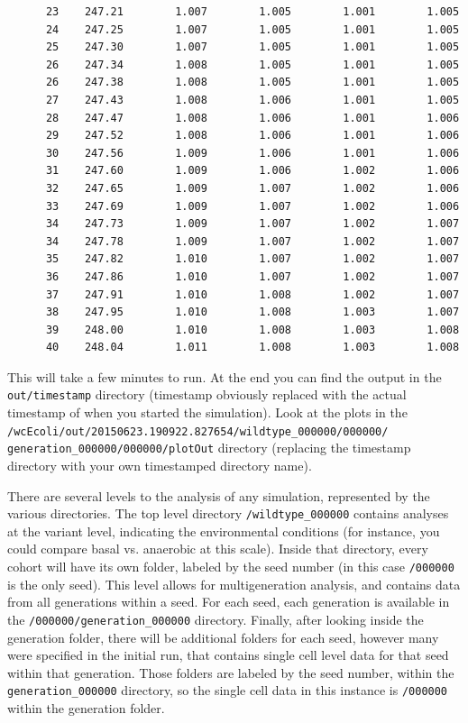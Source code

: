 \documentclass[12pt]{article}
\begin{document}
\begin{lstlisting}
      23    247.21        1.007        1.005        1.001        1.005
      24    247.25        1.007        1.005        1.001        1.005
      25    247.30        1.007        1.005        1.001        1.005
      26    247.34        1.008        1.005        1.001        1.005
      26    247.38        1.008        1.005        1.001        1.005
      27    247.43        1.008        1.006        1.001        1.005
      28    247.47        1.008        1.006        1.001        1.006
      29    247.52        1.008        1.006        1.001        1.006
      30    247.56        1.009        1.006        1.001        1.006
      31    247.60        1.009        1.006        1.002        1.006
      32    247.65        1.009        1.007        1.002        1.006
      33    247.69        1.009        1.007        1.002        1.006
      34    247.73        1.009        1.007        1.002        1.007
      34    247.78        1.009        1.007        1.002        1.007
      35    247.82        1.010        1.007        1.002        1.007
      36    247.86        1.010        1.007        1.002        1.007
      37    247.91        1.010        1.008        1.002        1.007
      38    247.95        1.010        1.008        1.003        1.007
      39    248.00        1.010        1.008        1.003        1.008
      40    248.04        1.011        1.008        1.003        1.008
\end{lstlisting}

\hfill \break
\hfill \break

This will take a few minutes to run. At the end you can find the output in the \texttt{out/timestamp} directory (timestamp obviously replaced with the actual timestamp of when you started the simulation). Look at the plots in the \texttt{/wcEcoli/out/20150623.190922.827654/wildtype\_000000/000000/ \allowbreak generation\_000000/000000/plotOut} directory (replacing the timestamp directory with your own timestamped directory name). 

There are several levels to the analysis of any simulation, represented by the various directories.  The top level directory \texttt{/wildtype\_000000} contains analyses at the variant level, indicating the environmental conditions (for instance, you could compare basal vs. anaerobic at this scale). Inside that directory, every cohort will have its own folder, labeled by the seed number (in this case \texttt{/000000} is the only seed). This level allows for multigeneration analysis, and contains data from all generations within a seed. For each seed, each generation is available in the \texttt{/000000/\allowbreak generation\_000000} directory. Finally, after looking inside the generation folder, there will be additional folders for each seed, however many were specified in the initial run, that contains single cell level data for that seed within that generation. Those folders are labeled by the seed number, within the \texttt{generation\_000000} directory, so the single cell data in this instance is \texttt{/000000} within the generation folder. 
\end{document}
